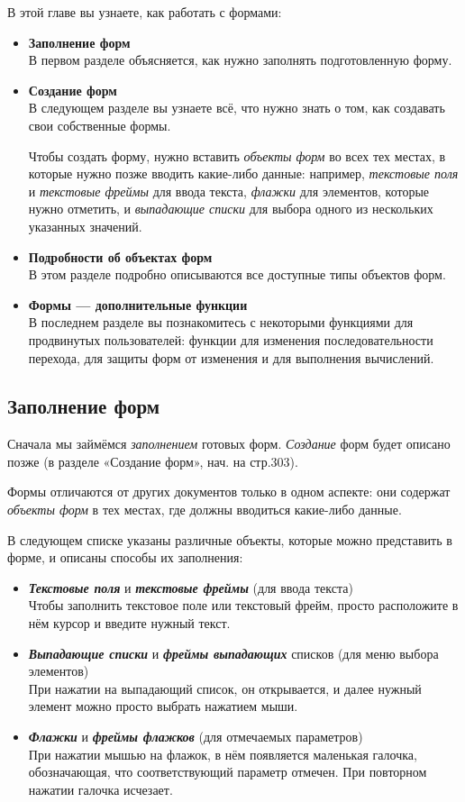 ﻿\documentclass[a4paper,10pt]{article}
\begin{document}
В этой главе вы узнаете, как работать с формами:
\begin{itemize}
 \item \textbf{Заполнение форм}\\
 В первом разделе объясняется, как нужно заполнять подготовленную форму.
 \item \textbf{Создание форм}\\
 В следующем разделе вы узнаете всё, что нужно знать о том, как создавать свои собственные формы.
 
 Чтобы создать форму, нужно вставить \textit{объекты форм} во всех тех местах, в которые нужно позже вводить какие-либо данные: например, \textit{текстовые поля} и \textit{текстовые фреймы} для ввода текста, \textit{флажки} для элементов, которые нужно отметить, и \textit{выпадающие списки} для выбора одного из нескольких указанных значений.
 \item \textbf{Подробности об объектах форм}\\
 В этом разделе подробно описываются все доступные типы объектов форм.
 \item \textbf{Формы — дополнительные функции}\\
 В последнем разделе вы познакомитесь с некоторыми функциями для продвинутых пользователей: функции для изменения последовательности перехода, для защиты форм от изменения и для выполнения вычислений.
\end{itemize}

\subsection{Заполнение форм}
Сначала мы займёмся \textit{заполнением} готовых форм. \textit{Создание} форм будет описано позже (в разделе «Создание форм», нач. на стр.303).

Формы отличаются от других документов только в одном аспекте: они содержат \textit{объекты форм} в тех местах, где должны вводиться какие-либо данные.

В следующем списке указаны различные объекты, которые можно представить в форме, и описаны способы их заполнения:

\begin{itemize}
 \item \textbf{\textit{Текстовые поля}} и \textbf{\textit{текстовые фреймы}} (для ввода текста)\\
 Чтобы заполнить текстовое поле или текстовый фрейм, просто расположите в нём курсор и введите нужный текст.
 \item \textit{\textbf{Выпадающие списки}} и  \textbf{\textit{фреймы выпадающих}} списков (для меню выбора элементов)\\
 При нажатии на выпадающий список, он открывается, и далее нужный элемент можно просто выбрать нажатием мыши.
 \item \textbf{\textit{Флажки}} и \textit{\textbf{фреймы флажков}} (для отмечаемых параметров)\\
 При нажатии мышью на флажок, в нём появляется маленькая галочка, обозначающая, что соответствующий параметр отмечен. При повторном нажатии галочка исчезает.
\end{itemize}
\end{document}
